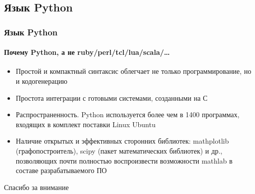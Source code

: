 \documentclass{beamer}
\begin{document}
\subsection{Язык Python}
\begin{frame}
\frametitle{Язык Python}
\framesubtitle{Почему Python, а не ruby/perl/tcl/lua/scala/\ldots}

\begin{itemize}
	\item<1>Простой и компактный синтаксис облегчает не только программирование, но
	и кодогенерацию
	\item<1>Простота интеграции с готовыми системами, созданными на С
	\item<1>Распространенность. Python используется более чем в 1400
	программах, входящих в комплект поставки Linux Ubuntu
	\item<1> Наличие открытых и эффективных сторонних библиотек: mathplotlib
	(графопостроитель), scipy (пакет математических библиотек) и др.,
	позволяющих почти полностью воспроизвести возможности mathlab в составе разрабатываемого ПО
\end{itemize}
\end{frame}

\begin{frame}
\begin{center}
\begin{LARGE}
Спасибо за внимание
\end{LARGE}
\end{center}
\end{frame}
\end{document}
